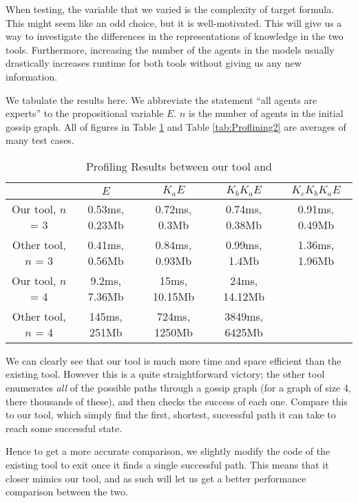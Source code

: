 \documentclass[10pt, a4paper]{report}
\begin{document}
When testing, the variable that we varied is the complexity of target formula.
This might seem like an odd choice, but it is well-motivated. This will give us
a way to investigate the differences in the representations of knowledge in the
two tools. Furthermore, increasing the number of the agents in the models
usually drastically increases runtime for both tools without giving us any new
information.

We tabulate the results here. We abbreviate the statement ``all agents are
experts'' to the propositional variable $E$. $n$ is the number of agents in the
initial gossip graph. All of figures in Table \ref{tab:Proflining1} and Table
\ref{tab:Proflining2} are averages of many test cases. 

\begin{table}[h]
  \centering
  \begin{tabular}{|c||c|c|c|c|}
    \hline
    & $E$ & $ K_a E$ & $K_b K_a E$ & $K_c K_b K_a E$ \\ \hline 
    Our tool, $n$ = 3 & 0.53ms, 0.23Mb & 0.72ms, 0.3Mb & 0.74ms, 0.38Mb & 0.91ms, 0.49Mb \\ \hline
    Other tool, $n$ = 3 & 0.41ms, 0.56Mb & 0.84ms, 0.93Mb & 0.99ms, 1.4Mb & 1.36ms, 1.96Mb \\ \hline \hline
    Our tool, $n$ = 4   & 9.2ms, 7.36Mb & 15ms, 10.15Mb & 24ms, 14.12Mb & \\ \hline
    Other tool, $n$ = 4 & 145ms, 251Mb & 724ms, 1250Mb & 3849ms, 6425Mb & \\ 
    \hline
  \end{tabular}
  \caption{Profiling Results between our tool and \cite{GithubGossip}}
  \label{tab:Proflining1}
\end{table}

We can clearly see that our tool is much more time and space efficient than the
existing tool. However this is a quite straightforward victory; the other tool
enumerates \emph{all} of the possible paths through a gossip graph (for a
graph of size 4, there thousands of these), and then checks the success of each
one. Compare this to our tool, which simply find the first, shortest, successful
path it can take to reach some successful state.

Hence to get a more accurate comparison, we slightly modify the code of the
existing tool to exit once it finds a single successful path. This means that it
closer mimics our tool, and as such will let us get a better performance
comparison between the two. 
\end{document}
